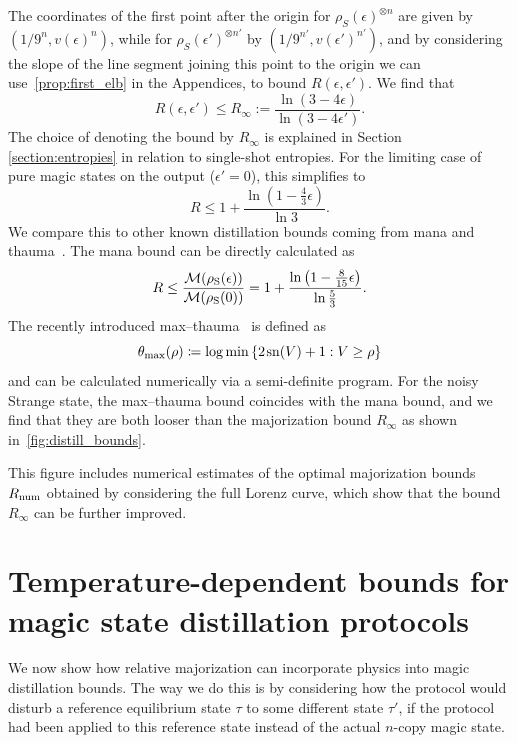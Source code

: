 \documentclass[pra,
aps,
twocolumn,
superscriptaddress,
groupedaddress,
nofootinbib,
reprint
]{revtex4-1}
\begin{document}
The coordinates of the first point after the origin for $\rho_S(\epsilon)^{\otimes n}$ are given by $(1/9^n, v(\epsilon)^n)$, while for $\rho_S(\epsilon')^{\otimes n'}$ by $(1/9^{n'}, v(\epsilon')^{n'})$, and by considering the slope of the line segment joining this point to the origin we can use~\cref{prop:first_elb} in the Appendices, to bound $R(\epsilon, \epsilon')$. We find that
\begin{equation}\label{eq:unital-bound}
	R(\epsilon, \epsilon') \leq R_\infty :=\frac{\ln (3-4\epsilon)}{\ln (3-4\epsilon')}.
\end{equation}
The choice of denoting the bound by $R_\infty$ is explained in Section \ref{section:entropies} in relation to single-shot entropies. For the limiting case of pure magic states on the output ($\epsilon'=0$), this simplifies to
\begin{equation}
	R \leq 1 + \frac{\ln (1 - \frac{4}{3} \epsilon)}{\ln 3}.
\end{equation}
We compare this to other known distillation bounds coming from mana and thauma~\cite{Wang_2020}. The mana bound can be directly calculated as
\begin{equation}
	R \leq \frac{{\mathcal M}(\rho_{\rm{S}}(\epsilon))}{{\mathcal M}(\rho_{\rm{S}}(0))} = 1 + \frac{\ln \left(1 - \frac{8}{15}\epsilon \right)}{\ln \frac{5}{3}}.
\end{equation}
The recently introduced max--thauma~\cite{Wang_2020} is defined as
\begin{equation}
	\theta_{\rm{max}}(\rho) \coloneqq \log \min{\{2\hspace{1pt} {{\rm{sn}}(V)} +1 : V \geq \rho\}}
\end{equation}
and can be calculated numerically via a semi-definite program. For the noisy Strange state, the max--thauma bound coincides with the mana bound, and we find that they are both looser than the majorization bound $R_\infty$ as shown in~\cref{fig:distill_bounds}. 

This figure includes numerical estimates of the optimal majorization bounds $R_{\rm{num}}$ obtained by considering the full Lorenz curve, which show that the bound $R_\infty$ can be further improved.

\section{Temperature-dependent bounds for magic state distillation protocols}
\label{sec:stab}

We now show how relative majorization can incorporate physics into magic distillation bounds. The way we do this is by considering how the protocol would disturb a reference equilibrium state $\tau$ to some different state $\tau'$, if the protocol had been applied to this reference state instead of the actual $n$-copy magic state. 
\end{document}
